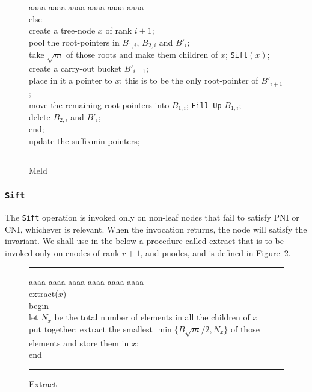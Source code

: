 \begin{figure}
\begin{tabbing}
aaaa \= aaaa \= aaaa \= aaaa \= aaaa \= aaaa \kill \\
\>else \\
\>\>create a tree-node $x$ of rank $i+1$; \\
\>\>pool the root-pointers in $B_{1,i}$, $B_{2,i}$ and $B'_{i}$; \\
\>\>take $\sqrt{m}$ of those roots and make them children of $x$; {\tt Sift}$(x)$; \\
\>\>create a carry-out bucket $B'_{i+1}$; \\ 
\>\>place in it a pointer to $x$; this is to be the only root-pointer of $B'_{i+1}$; \\ 
\>\>move the remaining root-pointers into $B_{1,i}$; {\tt Fill-Up} $B_{1,i}$; \\
\>\>delete $B_{2,i}$ and $B'_{i}$; \\
end; \\
update the suffixmin pointers; \\
\end{tabbing}
\vspace{0.1in}
\hrule
\vspace{0.2in}
\caption{Meld}
\label{fig:meld}
\end{figure}

\subsubsection{{\tt Sift}}

The {\tt Sift} operation is invoked only on non-leaf nodes that fail to satisfy 
	PNI or CNI, whichever is relevant.
When the invocation returns, the node will satisfy the invariant.
We shall use in the below a procedure called
	extract that is to be invoked only on cnodes of rank $r+1$, 
	and pnodes, and is defined in Figure~\ref{fig:extract}.

\begin{figure}[ht]
\vspace{0.2in}
\hrule
\begin{tabbing}
aaaa \= aaaa \= aaaa \= aaaa \= aaaa \= aaaa \kill \\
extract($x$) \\
begin \\
\> let $N_x$ be the total number of elements in all the children of $x$ \\
\> put together; extract the smallest $\min\{B\sqrt{m}/2,N_x\}$ of those \\
\> elements and store them in $x$; \\
end
\end{tabbing}
\vspace{0.1in}
\hrule
\vspace{0.2in}
\caption{Extract}
\label{fig:extract}
\end{figure}

